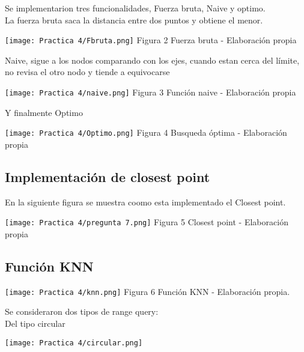 \documentclass{article}
\begin{document}
 \begin{flushleft}
Se implementarion tres funcionalidades, Fuerza bruta, Naive y optimo.\\
La fuerza bruta saca la distancia entre dos puntos y obtiene el menor.\\
\end{flushleft}
 \center\texttt{[image: Practica 4/Fbruta.png]}
 \center Figura 2 Fuerza bruta - Elaboración propia
 \begin{flushleft}
Naive, sigue a los nodos comparando con los ejes, cuando estan cerca del límite, no revisa el otro nodo y tiende a equivocarse\\
\end{flushleft}
 \center\texttt{[image: Practica 4/naive.png]}
 \center Figura 3 Función naive  - Elaboración propia
 \begin{flushleft}
Y finalmente Optimo\\
\end{flushleft}
 \center\texttt{[image: Practica 4/Optimo.png]}
 \center Figura 4 Busqueda óptima - Elaboración propia
\newpage\
\begin{flushleft}
\subsection{Implementación de closest point}
En la siguiente figura se muestra coomo esta implementado el Closest point.
\end{flushleft}
 \center\texttt{[image: Practica 4/pregunta 7.png]}
 \center Figura 5 Closest point - Elaboración propia
\begin{flushleft}
\subsection{Función KNN}
\end{flushleft} 
 \center\texttt{[image: Practica 4/knn.png]}
 \center Figura 6 Función KNN - Elaboración propia.\\
 \begin{flushleft}
 Se consideraron dos tipos de range query:\\
 Del tipo circular\\
 \end{flushleft} 
 \center\texttt{[image: Practica 4/circular.png]}
\end{document}
